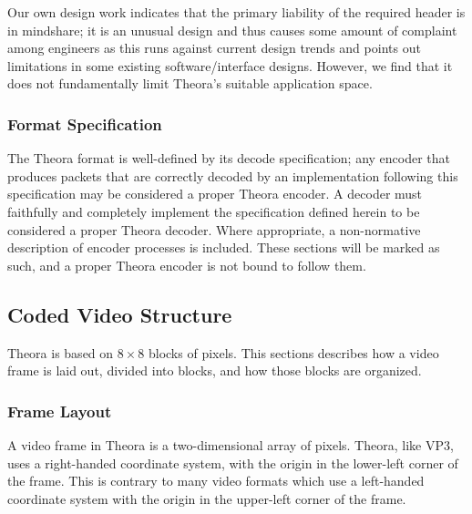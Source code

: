 \documentclass[11pt,letterpaper]{article}
\begin{document}
Our own design work indicates that the primary liability of the required header
 is in mindshare; it is an unusual design and thus causes some amount of
 complaint among engineers as this runs against current design trends and
 points out limitations in some existing software/interface designs.
However, we find that it does not fundamentally limit Theora's suitable
 application space.

\subsubsection{Format Specification}

The Theora format is well-defined by its decode specification; any encoder that
 produces packets that are correctly decoded by an implementation following
 this specification may be considered a proper Theora encoder.
A decoder must faithfully and completely implement the specification defined
 herein %
 to be considered a proper Theora decoder.
Where appropriate, a non-normative description of encoder processes is
 included.
These sections will be marked as such, and a proper Theora encoder is not
 bound to follow them.


\subsection{Coded Video Structure}

Theora is based on $8\times 8$ blocks of pixels.
This sections describes how a video frame is laid out, divided into blocks, and
 how those blocks are organized.

\subsubsection{Frame Layout}

A video frame in Theora is a two-dimensional array of pixels.
Theora, like VP3, uses a right-handed coordinate system, with the origin in the
 lower-left corner of the frame.
This is contrary to many video formats which use a left-handed coordinate
 system with the origin in the upper-left corner of the frame.
\end{document}
